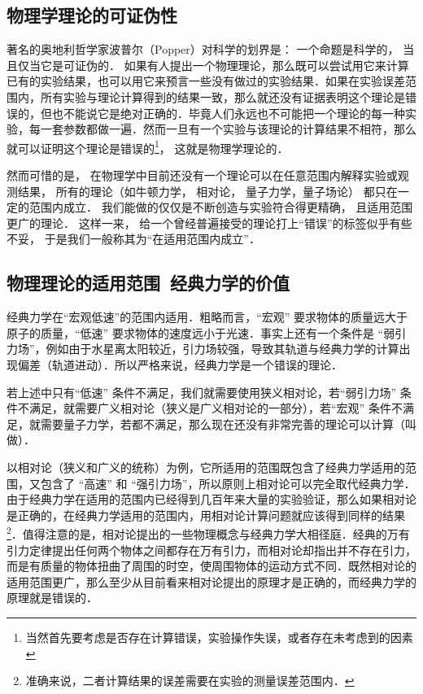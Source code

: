 
\subsection{物理学理论的可证伪性}

著名的奥地利哲学家波普尔（Popper）对科学的划界是： 一个命题是科学的， 当且仅当它是可证伪的． 如果有人提出一个物理理论，那么既可以尝试用它来计算已有的实验结果，也可以用它来预言一些没有做过的实验结果．如果在实验误差范围内，所有实验与理论计算得到的结果一致，那么就还没有证据表明这个理论是错误的，但也不能说它是绝对正确的．毕竟人们永远也不可能把一个理论的每一种实验，每一套参数都做一遍．然而一旦有一个实验与该理论的计算结果不相符，那么就可以证明这个理论是错误的\footnote{当然首先要考虑是否存在计算错误，实验操作失误，或者存在未考虑到的因素}， 这就是物理学理论的．

然而可惜的是， 在物理学中目前还没有一个理论可以在任意范围内解释实验或观测结果， 所有的理论（如牛顿力学， 相对论， 量子力学，量子场论） 都只在一定的范围内成立． 我们能做的仅仅是不断创造与实验符合得更精确， 且适用范围更广的理论． 这样一来， 给一个曾经普遍接受的理论打上“错误”的标签似乎有些不妥， 于是我们一般称其为“在适用范围内成立”．


\subsection{物理理论的适用范围\ 经典力学的价值}

经典力学在“宏观低速”的范围内适用．粗略而言，“宏观” 要求物体的质量远大于原子的质量，“低速” 要求物体的速度远小于光速．事实上还有一个条件是 “弱引力场”，例如由于水星离太阳较近，引力场较强，导致其轨道与经典力学的计算出现偏差（轨道进动）．所以严格来说，经典力学是一个错误的理论．

若上述中只有“低速” 条件不满足，我们就需要使用狭义相对论，若“弱引力场” 条件不满足，就需要广义相对论（狭义是广义相对论的一部分），若“宏观” 条件不满足，就需要量子力学，若都不满足，那么现在还没有非常完善的理论可以计算（叫做）．

以相对论（狭义和广义的统称）为例，它所适用的范围既包含了经典力学适用的范围，又包含了 “高速” 和 “强引力场”，所以原则上相对论可以完全取代经典力学．由于经典力学在适用的范围内已经得到几百年来大量的实验验证，那么如果相对论是正确的，在经典力学适用的范围内，用相对论计算问题就应该得到同样的结果\footnote{准确来说，二者计算结果的误差需要在实验的测量误差范围内．}．值得注意的是，相对论提出的一些物理概念与经典力学大相径庭．经典的万有引力定律提出任何两个物体之间都存在万有引力，而相对论却指出并不存在引力，而是有质量的物体扭曲了周围的时空，使周围物体的运动方式不同．既然相对论的适用范围更广，那么至少从目前看来相对论提出的原理才是正确的，而经典力学的原理就是错误的． 


